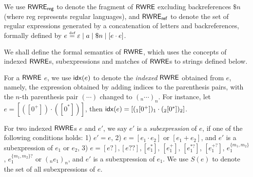 We use ${\sf RWRE_{reg}}$ to denote the fragment of ${\sf RWRE}$ excluding backreferences $\$ n$ (where {\sf reg} represents regular languages), and ${\sf RWRE_{ref}}$ to denote the set of regular expressions generated by a concatenation of letters and backreferences, formally %
defined by $e \eqdef \varepsilon \mid a \mid \$n \mid [e \concat e]$.  
  
  

We shall define the formal semantics of ${\sf RWRE}$, which uses the concepts of indexed ${\sf RWRE}$s, subexpressions and matches of ${\sf RWRE}$s to strings defined below.

For a ${\sf RWRE}$ $e$, we use ${\sf idx}(e)$ to denote the \emph{indexed} ${\sf RWRE}$ obtained from $e$, namely, the expression obtained by adding indices to the parenthesis pairs, with the $n$-th parenthesis pair $(\cdots)$ changed to $(_n \cdots )_n$. For instance, let $e = [([0^+]) \cdot ([0^*])]$, then ${\sf idx}(e) =  [(_1[0^+])_1 \cdot (_2[0^*])_2]$.
  
   For two indexed ${\sf RWRE}$s $e$ and $e'$, we say $e'$ is a \emph{subexpression} of $e$,
  	if one of the following conditions holds: 1) $e'=e$, 2) $e = [e_1 \cdot e_2]$ or $[e_1 + e_2]$, and $e'$ is a subexpression of $e_1$ or $e_2$, 3) $e = [e?], [e??], [e_1^{\ast}]$, $[e_1^{+}]$, $[e_1^{\ast?}]$, $[e_1^{+?}]$, $e_1^{\{m_1, m_2\}}$, $e_1^{\{m_1, m_2\}?}$ or $(_n e_1)_n$, and $e'$ is a subexpression of $e_1$. We use $S(e)$ to denote the set of all subexpressions of $e$. %
  
